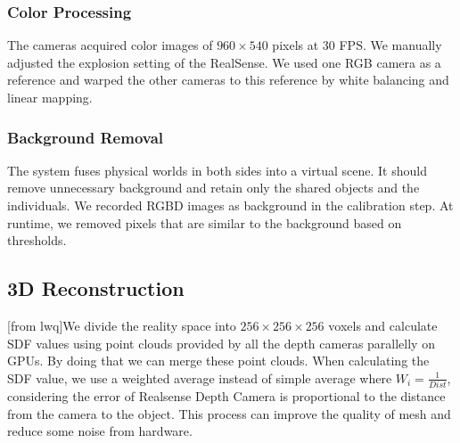
\subsubsection{Color Processing}


The cameras acquired color images of $960 \times 540$ pixels at 30 FPS. We manually adjusted the explosion setting of the RealSense. We used one RGB camera as a reference and warped the other cameras to this reference by white balancing and linear mapping.

\subsubsection{Background Removal}

The system fuses physical worlds in both sides into a virtual scene. It should remove unnecessary background and retain only the shared objects and the individuals. We recorded RGBD images as background in the calibration step. At runtime, we removed pixels that are similar to the background based on thresholds.

\subsection{3D Reconstruction}

[from lwq]We divide the reality space into $256 \times 256 \times 256$ voxels and calculate SDF values using point clouds provided by all the depth cameras parallelly on GPUs. By doing that we can merge these point clouds. When calculating the SDF value, we use a weighted average instead of simple average where  $W_{i} = \frac{1}{Dist}$, considering the error of Realsense Depth Camera is proportional to the distance from the camera to the object. This process can improve the quality of mesh and reduce some noise from hardware. 
    
